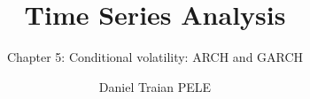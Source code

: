 \title[Time Series Analysis]{Time Series Analysis}
\subtitle{Chapter 5: Conditional volatility: ARCH and GARCH}
\author[D.T. Pele]{Daniel Traian PELE}
\date{}

\providecommand{\tsaapplink}[3]{\hypertarget{#2}{}\hyperlink{#1}{\beamergotobutton{#3}}}  %
\providecommand{\tsaappback}[2]{\begin{tikzpicture}[remember picture,overlay]\node[anchor=south east] at ([xshift=-3mm,yshift=7mm]current page.south east){\hyperlink{#1}{\beamerreturnbutton{#2}}};\end{tikzpicture}}  %
\providecommand{\tsachlink}[2]{\href{#1}{#2}}  %
\providecommand{\tsachlinkt}[2]{\href{#1}{\usebeamercolor[fg]{frametitle}#2}}  %


